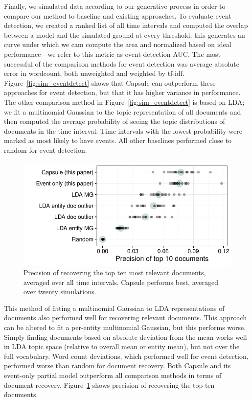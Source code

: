 Finally, we simulated data according to our generative process in order to compare our method to baseline and existing approaches.  
To evaluate event detection, we created a ranked list of all time intervals and computed the overlap between a model and the simulated ground at every threshold; this generates an curve under which we cam compute the area and normalized based on ideal performance---we refer to this metric as event detection AUC.  
The most successful of the comparison methods for event detection was average absolute error in wordcount, both unweighted and weighted by tf-idf.  Figure~\ref{fig:sim_eventdetect} shows that Capsule can outperform these approaches for event detection, but that it has higher variance in performance.  The other comparison method in Figure~\ref{fig:sim_eventdetect} is based on LDA; we fit a multinomial Gaussian to the topic representation of all documents and then computed the average probability of seeing the topic distributions of documents in the time interval.  Time intervals with the lowest probability were marked as most likely to have events.  All other baselines performed close to random for event detection.

\begin{figure}
\centering
\includegraphics[width=\linewidth]{fig/precision10.pdf}
\caption{Precision of recovering the top ten most relevant documents, averaged over all time intervals.  Capsule performs best, averaged over twenty simulations.}
\label{fig:sim_precision}
\end{figure}

This method of fitting a multinomial Gaussian to LDA representations of documents also performed well for recovering relevant documents.  This approach can be altered to fit a per-entity multinomial Gaussian, but this performs worse.  Simply finding documents based on absolute deviation from the mean works well in LDA topic space (relative to overall mean or entity mean), but not over the full vocabulary.  Word count deviations, which performed well for event detection, performed worse than random for document recovery.  Both Capsule and its event-only partial model outperform all comparison methods in terms of document recovery.  Figure~\ref{fig:sim_precision} shows precision of recovering the top ten documents.

